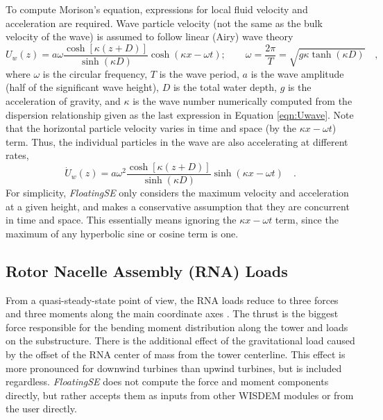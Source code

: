 To compute Morison's equation, expressions for local fluid velocity and
acceleration are required.  Wave particle velocity (not the same as the bulk
velocity of the wave) is assumed to follow linear (Airy) wave theory
\begin{equation} \label{eqn:Uwave}
U_w(z) = a\omega\frac{\cosh\left[\kappa\left(z + D \right)\right]}{\sinh\left(\kappa D\right)}\cosh\left(\kappa x -
  \omega t\right);
\qquad \omega=\frac{2\pi}{T} = \sqrt{ g \kappa \tanh\left(\kappa
    D\right) } \quad,
\end{equation}
where $\omega$ is the circular frequency, $T$ is the wave period, $a$ is
the wave amplitude (half of the significant wave height), $D$ is the
total water depth, $g$ is the acceleration of gravity, and $\kappa$ is
the wave number numerically computed from the dispersion relationship
given as the last expression in Equation \ref{eqn:Uwave}.  Note that the
horizontal particle velocity varies in time and space (by the
$\kappa x - \omega t$) term.  Thus, the individual particles in the wave
are also accelerating at different rates,
\begin{equation} \label{eqn:Awave}
\dot{U}_w(z) = a\omega^2\frac{\cosh\left[\kappa\left(z + D \right)\right]}{\sinh\left(\kappa D\right)}\sinh\left(\kappa x -
  \omega t\right)\quad.
\end{equation}
For
simplicity, \textit{FloatingSE} only considers the maximum velocity and
acceleration at a given height, and makes a conservative assumption that
they are concurrent in time and space.  This essentially means ignoring the
$\kappa x - \omega t$ term, since the maximum of any hyperbolic sine or cosine
term is one.


\subsection{Rotor Nacelle Assembly (RNA) Loads}
From a quasi-steady-state point of view, the RNA loads reduce to three
forces and three moments along the main coordinate axes
\citep{JacketSE}. The thrust is the biggest force responsible for the
bending moment distribution along the tower and loads on the
substructure.  There is the additional effect of the gravitational load
caused by the offset of the RNA center of mass from the tower
centerline.  This effect is more pronounced for downwind turbines than
upwind turbines, but is included regardless.  \textit{FloatingSE} does
not compute the force and moment components directly, but rather accepts
them as inputs from other WISDEM modules or from the user directly.


